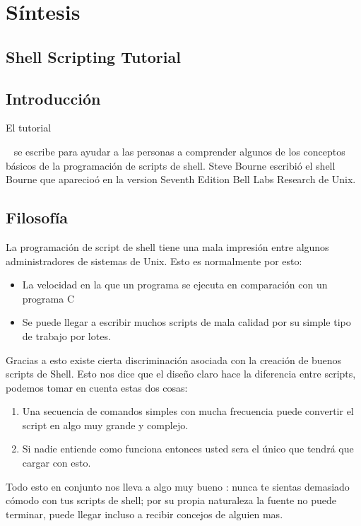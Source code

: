 \documentclass[12pt,letterpaper]{article}
\begin{document}
	\section{Síntesis}
    \subsection*{Shell Scripting Tutorial}
        \subsection{Introducción}
       El tutorial{~\cite{Tutorial:Misc} se escribe para ayudar a las personas a comprender algunos de los conceptos básicos de la programación de scripts de shell. Steve Bourne escribió el shell Bourne que aparecioó en la version Seventh Edition Bell Labs Research de Unix. 
        \subsection{Filosofía}
        La programación de script de shell tiene una mala impresión entre algunos administradores de sistemas de Unix. Esto es normalmente por esto:
        \begin{itemize}
        \item La velocidad en la que un programa se ejecuta en comparación con un programa C
        \item Se puede llegar a escribir muchos scripts de mala calidad por su simple tipo de trabajo por lotes.
        \end{itemize}    
        Gracias a esto existe cierta discriminación asociada con la creación de buenos scripts de Shell. Esto nos dice que el diseño claro hace la diferencia entre scripts, podemos tomar en cuenta estas dos cosas: 
        \begin{enumerate}
        \item Una secuencia de comandos simples con mucha frecuencia puede convertir el script en algo muy grande y complejo.
        \item Si nadie entiende como funciona entonces usted sera el único que tendrá que cargar con esto.
        \end{enumerate}
        Todo esto en conjunto nos lleva a algo muy bueno : \textsf{nunca} te sientas demasiado cómodo con tus scripts de shell; por su propia naturaleza la fuente no puede terminar, puede llegar incluso a recibir concejos de alguien mas.
}
\end{document}
